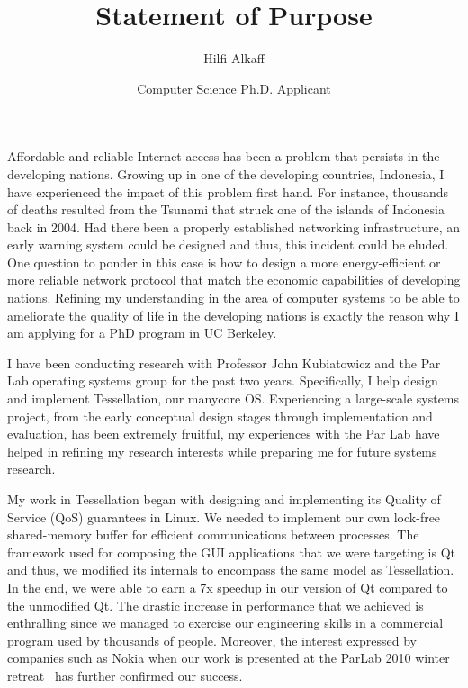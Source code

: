 \documentclass[11pt]{article}
\title{Statement of Purpose}
\author{Hilfi Alkaff}
\date{Computer Science Ph.D. Applicant}
\begin{document}
  \maketitle%

Affordable and reliable Internet access has been a problem that persists in the developing nations. Growing up in one of the developing countries, Indonesia, I have experienced the impact of this problem first hand. For instance, thousands of deaths resulted from the Tsunami that struck one of the islands of Indonesia back in 2004. Had there been a properly established networking infrastructure, an early warning system could be designed and thus, this incident could be eluded. One question to ponder in this case is how to design a more energy-efficient or more reliable network protocol that match the economic capabilities of developing nations. Refining my understanding in the area of computer systems to be able to ameliorate the quality of life in the developing nations is exactly the reason why I am applying for a PhD program in UC Berkeley. \newline

I have been conducting research with Professor John Kubiatowicz and the Par Lab operating systems group for the past two years. Specifically, I help design and implement Tessellation, our manycore OS. Experiencing a large-scale systems project, from the early conceptual design stages through implementation and evaluation, has been extremely fruitful, my experiences with the Par Lab have helped in refining my research interests while preparing me for future systems research. \newline

My work in Tessellation began with designing and implementing its Quality of Service (QoS) guarantees in Linux. We needed to implement our own lock-free shared-memory buffer for efficient communications between processes. The framework used for composing the GUI applications that we were targeting is Qt and thus, we modified its internals to encompass the same model as Tessellation. In the end, we were able to earn a 7x speedup in our version of Qt compared to the unmodified Qt. The drastic increase in performance that we achieved is enthralling since we managed to exercise our engineering skills in a commercial program used by thousands of people. Moreover, the interest expressed by companies such as Nokia when our work is presented at the ParLab 2010 winter retreat~\cite{tess_retreat2010} has further confirmed our success. \newline
\end{document}
